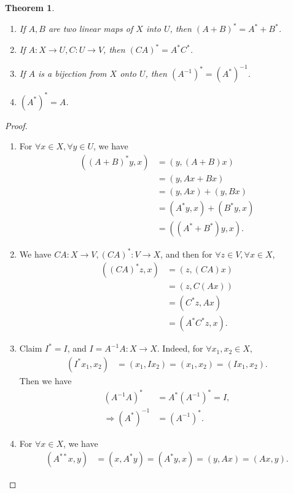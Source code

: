 \documentclass[11pt]{book}
\newtheorem{theorem}{Theorem}[chapter]
\theoremstyle{definition}
\numberwithin{equation}{chapter}
\begin{document}
\begin{theorem}\label{transpose_linear_map_theorem}
~\begin{enumerate}[label=(\alph*)]
    \item If $A,B$ are two linear maps of $X$ into $U$, then $(A+B)^* = A^* + B^*$.
    \item If $A:X\to U, C:U\to V$, then $(CA)^* = A^* C^*$.
    \item If $A$ is a bijection from $X$ onto $U$, then $\left(A^{-1}\right)^* = \left(A^*\right)^{-1}$.
    \item $\left(A^*\right)^* = A$.
\end{enumerate}
\end{theorem}
\begin{proof}
~\begin{enumerate}[label=(\alph*)]
    \item For $\forall x\in X, \forall y\in U$, we have
    \begin{align*}
        \left((A+B)^*y, x\right) & = (y, (A+B)x) \\
        & = (y, Ax + Bx) \\
        & = (y, Ax) + (y, Bx) \\
        & = (A^*y, x) + (B^*y, x) \\
        & = ((A^* + B^*)y, x).
    \end{align*}
    \item We have $CA:X\to V, (CA)^*:V\to X$, and then for $\forall z\in V, \forall x\in X$,
    \begin{align*}
        \left((CA)^*z, x\right) & = (z, (CA)x) \\
        & = (z, C(Ax)) \\
        & = (C^* z, Ax) \\
        & = (A^* C^* z, x).
    \end{align*}
    \item Claim $I^* = I$, and $I = A^{-1}A: X\to X$. Indeed,  for $\forall x_1, x_2\in X$,
    \begin{align*}
        (I^* x_1, x_2) & = (x_1, Ix_2) = (x_1, x_2) = (Ix_1, x_2).
    \end{align*}
    Then we have 
    \begin{align*}
        \left(A^{-1}A\right)^* & = A^* \left(A^{-1}\right)^* = I, \\
        \Rightarrow \left(A^*\right)^{-1} & = \left(A^{-1}\right)^*. 
    \end{align*}
    \item For $\forall x\in X$, we have
    \begin{align*}
        \left(A^{**}x, y\right) & = (x, A^*y) = (A^*y, x) = (y, Ax) = (Ax, y).
    \end{align*}
\end{enumerate}
\end{proof}
\end{document}
